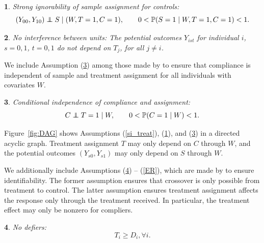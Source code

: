 \documentclass[12pt]{article}
\makeatletter
\newtheorem*{assumption*}{\assumptionnumber}
\providecommand{\assumptionnumber}{}
\newenvironment{assumption}[2]
 {%
  \renewcommand{\assumptionnumber}{Assumption #1}%
  \begin{assumption*}%
  \protected@edef\@currentlabel{#1}%
 }
 {%
  \end{assumption*}
 }
\newcommand{\pr}{\mathbb{P}} %
\newcommand\independent{\protect\mathpalette{\protect\independenT}{\perp}}
\def\independenT#1#2{\mathrel{\rlap{$#1#2$}\mkern2mu{#1#2}}}
\makeatother
\begin{document}
\begin{assumption}{3}{}\label{si_ctrl}
Strong ignorability of sample assignment for controls:
\begin{equation*}
(Y_{00}, Y_{10}) \independent S \mid (W, T=1,C = 1), \qquad 0 < \pr(S=1 \mid W, T=1,C = 1) <1. 
\end{equation*}\end{assumption}
 
\begin{assumption}{4}{}\label{sutva}
No interference between units: The potential outcomes $Y_{ist}$ for individual $i$, $s = 0,1$, $t=0,1$ do not depend on $T_j$, for all $j\neq i$. 

\end{assumption} 

We include Assumption (\ref{compl}) among those made by \cite{Hartman} to ensure that compliance is independent of sample and treatment assignment for all individuals with covariates $W$. 
 
\begin{assumption}{5}{}\label{compl}
Conditional independence of compliance and assignment:
\begin{equation*}
C \independent T=1 \mid W, \qquad 0 < \pr(C = 1 \mid W) < 1. 
\end{equation*}
\end{assumption}

Figure~\ref{fig:DAG} shows Assumptions (\ref{si_treat}), (\ref{si_ctrl}), and (\ref{compl}) in a directed acyclic graph.  Treatment assignment $T$ may only depend on $C$ through $W$, and the potential outcomes $(Y_{s0}, Y_{s1})$ may only depend on $S$ through $W$.

We additionally include Assumptions (\ref{monotonicity}) -- (\ref{ER}), which are made by \cite{Angrist1996} to ensure identifiability. The former assumption ensures that crossover is only possible from treatment to control.  The latter assumption ensures treatment assignment affects the response only through the treatment received.  In particular, the treatment effect may only be nonzero for compliers.

\begin{assumption}{6}{}\label{monotonicity}
No defiers: 
\begin{equation*}
T_i \geq D_i, \forall i. 
\end{equation*}
\end{assumption}
\end{document}
